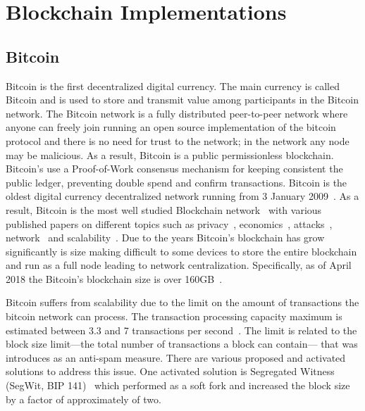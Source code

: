 \clearpage

\section{Blockchain Implementations}\label{blockchain_implementations}

\subsection{Bitcoin}\label{blockchain:impl:bitcoin}

Bitcoin is the first decentralized digital currency. The main currency is called Bitcoin and is used to store and transmit value among participants in the Bitcoin network. The Bitcoin network is a fully distributed peer-to-peer network where anyone can freely join running an open source implementation of the bitcoin protocol and there is no need for trust to the network; in the network any node may be malicious. As a result, Bitcoin is a public permissionless blockchain. Bitcoin's use a Proof-of-Work consensus mechanism for keeping consistent the public ledger, preventing double spend and confirm transactions. Bitcoin is the oldest digital currency decentralized network running from 3 January 2009~\cite{btc_first_block}. As a result, Bitcoin is the most well studied Blockchain network~\cite{10.1007/978-3-662-46803-6_10} with various published papers on different topics such as privacy~\cite{10.1007/978-3-319-70278-0_8, 10.1007/978-3-642-39884-1_2, Bonneau14e.w.:mixcoin, 10.1007/978-3-662-44774-1_9}, economics~\cite{Babaioff:2012:BRB:2229012.2229022, 10.1007/978-3-319-70278-0_17, Bentov2017DecentralizedPM, Carlsten:2016:IBW:2976749.2978408}, attacks~\cite{DBLP:journals_corr_Bahack13, DBLP:journals_corr_EyalS13}, network~\cite{10.1007/978-3-662-44774-1_7, 190890} and scalability~\cite{kiayias2017non, 10.1007/978-3-662-53357-4_5, 10.1007/978-3-662-53357-4_8}. Due to the years Bitcoin's blockchain has grow significantly is size making difficult to some devices to store the entire blockchain and run as a full node leading to network centralization. Specifically, as of April 2018 the Bitcoin's blockchain size is over 160GB~\cite{btc_bl_size}.

Bitcoin suffers from scalability due to the limit on the amount of transactions the bitcoin network can process. The transaction processing capacity maximum is estimated between 3.3 and 7 transactions per second~\cite{10.1007/978-3-662-53357-4_8}. The limit is related to the block size limit---the total number of transactions a block can contain--- that was introduces as an anti-spam measure. There are various proposed and activated solutions to address this issue. One activated solution is Segregated Witness (SegWit, BIP 141)~\cite{segwit} which performed as a soft fork and increased the block size by a factor of approximately of two.

